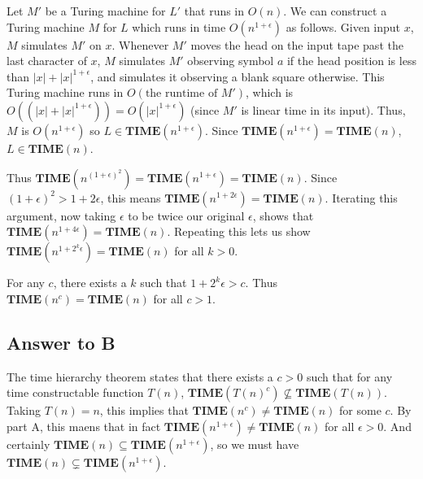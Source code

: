 \documentclass{article}
\newcommand{\TIME}{\mathbf{TIME}}
\begin{document}
	Let $M'$ be a Turing machine for $L'$ that runs in $O(n)$.  We can construct a Turing machine $M$ for $L$ which runs in time $O(n^{1 + \epsilon})$ as follows.  Given input $x$, $M$ simulates $M'$ on $x$.  Whenever $M'$ moves the head on the input tape past the last character of $x$, $M$ simulates $M'$ observing symbol $a$ if the head position is less than $|x| + |x|^{1 + \epsilon}$, and simulates it observing a blank square otherwise.  This Turing machine runs in $O(\text{the runtime of } M')$, which is $O((|x| + |x|^{1 + \epsilon})) = O(|x|^{1 + \epsilon})$ (since $M'$ is linear time in its input).  Thus, $M$ is $O(n^{1 + \epsilon})$ so $L \in \TIME(n^{1 + \epsilon})$.  Since $\TIME(n^{1 + \epsilon}) = \TIME(n)$, $L \in \TIME(n)$.

	Thus $\TIME(n^{(1 + \epsilon)^2}) = \TIME(n^{1 + \epsilon}) = \TIME(n)$.  Since $(1 + \epsilon)^2 > 1 + 2 \epsilon$, this means $\TIME(n^{1 + 2 \epsilon}) = \TIME(n)$.  Iterating this argument, now taking $\epsilon$ to be twice our original $\epsilon$, shows that $\TIME(n^{1 + 4 \epsilon}) = \TIME(n)$.  Repeating this lets us show $\TIME(n^{1 + 2^k \epsilon}) = \TIME(n)$ for all $k > 0$.

	For any $c$, there exists a $k$ such that $1 + 2^k \epsilon > c$.  Thus $\TIME(n^c) = \TIME(n)$ for all $c > 1$.

	\subsection*{Answer to B}

	The time hierarchy theorem states that there exists a $c > 0$ such that for any time constructable function $T(n)$, $\TIME(T(n)^c) \not\subseteq \TIME(T(n))$.
	Taking $T(n) = n$, this implies that $\TIME(n^c) \neq \TIME(n)$ for some $c$.
	By part A, this maens that in fact $\TIME(n^{1 + \epsilon}) \neq \TIME(n)$ for all $\epsilon > 0$.  And certainly $\TIME(n) \subseteq \TIME(n^{1 + \epsilon})$, so we must have $\TIME(n) \subsetneq \TIME(n^{1 + \epsilon})$.

		
\end{document}
